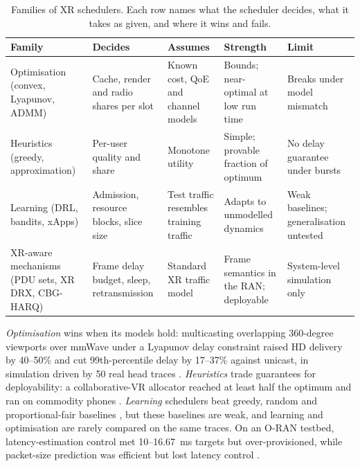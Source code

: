 \begin{table}[t]
\centering\small
\caption{Families of XR schedulers. Each row names what the scheduler decides, what it takes as given,
and where it wins and fails.}
\label{tab:provision-families}
\setlength{\tabcolsep}{4pt}
\begin{tabularx}{\linewidth}{@{}>{\raggedright\arraybackslash}p{3.3cm}>{\raggedright\arraybackslash}p{2.4cm}>{\raggedright\arraybackslash}X>{\raggedright\arraybackslash}X>{\raggedright\arraybackslash}X@{}}
\toprule
Family & Decides & Assumes & Strength & Limit \\
\midrule
Optimisation (convex, Lyapunov, ADMM)\newline \cite{W2887223659,W2901851646} & Cache, render and
  radio shares per slot & Known cost, QoE and channel models & Bounds; near-optimal at low run time &
  Breaks under model mismatch \\\addlinespace[2pt]
Heuristics (greedy, approximation)\newline \cite{W4312555471} & Per-user quality and share & Monotone
  utility & Simple; provable fraction of optimum & No delay guarantee under bursts \\\addlinespace[2pt]
Learning (DRL, bandits, xApps)\newline \cite{W2596760110,W4410491869} & Admission, resource blocks,
  slice size & Test traffic resembles training traffic & Adapts to unmodelled dynamics & Weak
  baselines; generalisation untested \\\addlinespace[2pt]
XR-aware mechanisms (PDU sets, XR DRX, CBG-HARQ) \cite{W7168254691,W3209239392,W4315777456}
  & Frame delay budget, sleep, retransmission & Standard XR traffic model & Frame semantics in
  the RAN; deployable & System-level simulation only \\
\bottomrule
\end{tabularx}
\end{table}

\emph{Optimisation} wins when its models hold: multicasting overlapping 360-degree viewports over mmWave
under a Lyapunov delay constraint raised HD delivery by 40--50\% and cut 99th-percentile delay by
17--37\% against unicast, in simulation driven by 50 real head traces \cite{W2901851646}.
\emph{Heuristics} trade guarantees for deployability: a collaborative-VR allocator reached at least half
the optimum and ran on commodity phones \cite{W4312555471}. \emph{Learning} schedulers beat greedy,
random and proportional-fair baselines \cite{W2596760110}, but these baselines are weak, and learning
and optimisation are rarely compared on the same traces. On an O-RAN testbed, latency-estimation control
met 10--16.67~ms targets but over-provisioned, while packet-size prediction was efficient but lost
latency control \cite{W4410491869}.

